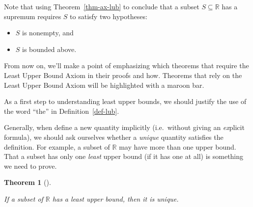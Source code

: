 \documentclass[
  letterpaper,
  DIV=11,
  numbers=noendperiod]{scrreprt}
\providecommand{\tightlist}{%
  \setlength{\itemsep}{0pt}\setlength{\parskip}{0pt}}
\def\R{\mathbb R}
\theoremstyle{plain}
\newtheorem{theorem}{Theorem}[chapter]
\theoremstyle{definition}
\theoremstyle{plain}
\theoremstyle{plain}
\theoremstyle{definition}
\theoremstyle{definition}
\theoremstyle{remark}
\begin{document}
\begin{tcolorbox}[enhanced jigsaw, titlerule=0mm, opacitybacktitle=0.6, leftrule=.75mm, bottomrule=.15mm, left=2mm, arc=.35mm, colback=white, rightrule=.15mm, colframe=quarto-callout-tip-color-frame, toptitle=1mm, breakable, opacityback=0, colbacktitle=quarto-callout-tip-color!10!white, bottomtitle=1mm, title=\textcolor{quarto-callout-tip-color}{\faLightbulb}\hspace{0.5em}{Tip}, coltitle=black, toprule=.15mm]

Note that using Theorem~\ref{thm-ax-lub} to conclude that a subset
\(S\subseteq\R\) has a supremum requires \(S\) to satisfy two
hypotheses:

\begin{itemize}
\tightlist
\item
  \(S\) is nonempty, and
\item
  \(S\) is bounded above.
\end{itemize}

\end{tcolorbox}

From now on, we'll make a point of emphasizing which theorems that
require the Least Upper Bound Axiom in their proofs and how. Theorems
that rely on the Least Upper Bound Axiom will be highlighted with a
{maroon} bar.

As a first step to understanding least upper bounds, we should justify
the use of the word ``the'' in Definition~\ref{def-lub}.

\begin{tcolorbox}[enhanced jigsaw, titlerule=0mm, opacitybacktitle=0.6, leftrule=.75mm, bottomrule=.15mm, left=2mm, arc=.35mm, colback=white, rightrule=.15mm, colframe=quarto-callout-tip-color-frame, toptitle=1mm, breakable, opacityback=0, colbacktitle=quarto-callout-tip-color!10!white, bottomtitle=1mm, title=\textcolor{quarto-callout-tip-color}{\faLightbulb}\hspace{0.5em}{Tip}, coltitle=black, toprule=.15mm]

Generally, when define a new quantity implicitly (i.e.~without giving an
\emph{ex}plicit formula), we should ask ourselves whether a
\emph{unique} quantity satisfies the definition. For example, a subset
of \(\R\) may have more than one upper bound. That a subset has only one
\emph{least} upper bound (if it has one at all) is something we need to
prove.

\end{tcolorbox}

\begin{theorem}[]\protect\hypertarget{thm-lub-unique}{}\label{thm-lub-unique}

If a subset of \(\R\) has a least upper bound, then it is unique.

\end{theorem}
\end{document}
